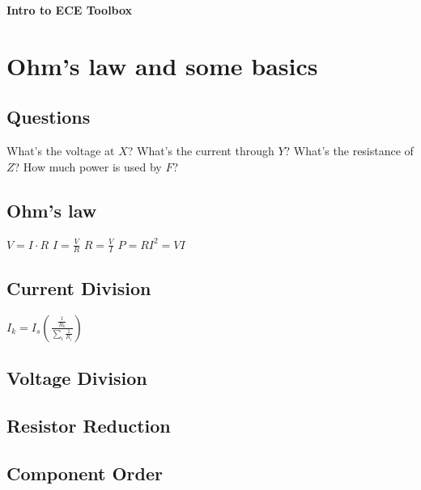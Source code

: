 \documentclass[10pt,landscape]{article}
\begin{document}
\footnotesize

\begin{center}
     \Large{\textbf{Intro to ECE Toolbox}} 
\end{center}

\section{Ohm's law and some basics}
\subsection{Questions}
What's the voltage at $X$? What's the current through $Y$?
What's the resistance of $Z$? How much power is used by $F$?
\subsection{Ohm's law}
$V=I \cdot R$ \hspace{1cm}
$I=\frac{V}{R}$ \hspace{1cm}
$R=\frac{V}{I}$ \hspace{1cm}
$P=RI^2=VI$ \vspace{1cm}

\subsection{Current Division}
$I_k=I_s\left( \frac{\frac{1}{R_k}}{\sum\limits_i{\frac{1}{R_i}}} \right)$
\subsection{Voltage Division}

\subsection{Resistor Reduction}

\subsection{Component Order}





\end{document}
